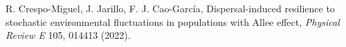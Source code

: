 \documentclass[11pt,a4paper]{article}
\begin{document}
\begin{sincabstract}

\begin{enumerate}[label={[\arabic*]},leftmargin=*]
\item R. Crespo-Miguel, J. Jarillo, F. J. Cao-García, Dispersal-induced resilience to stochastic environmental fluctuations in populations with Allee effect, \textit{Physical Review E} 105, 014413 (2022).
\end{enumerate}
\end{sincabstract}

\end{document}
